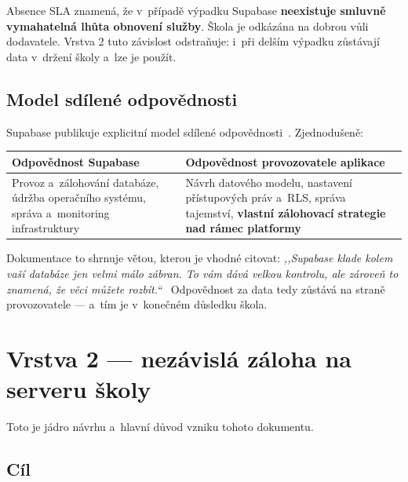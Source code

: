 \documentclass[11pt,a4paper]{article}
\begin{document}
\begin{informace}
Absence SLA znamená, že v~případě výpadku Supabase \textbf{neexistuje smluvně vymahatelná lhůta
obnovení služby}. Škola je odkázána na dobrou vůli dodavatele. Vrstva 2 tuto závislost odstraňuje:
i~při delším výpadku zůstávají data v~držení školy a~lze je použít.
\end{informace}

\subsection{Model sdílené odpovědnosti}

Supabase publikuje explicitní model sdílené odpovědnosti~\cite{sdilenaodpovednost}. Zjednodušeně:

\begin{center}
\begin{tabularx}{\textwidth}{@{}p{5.2cm}X@{}}
\toprule
\textbf{Odpovědnost Supabase} & \textbf{Odpovědnost provozovatele aplikace} \\
\midrule
Provoz a~zálohování databáze, údržba operačního systému, správa a~monitoring infrastruktury &
Návrh datového modelu, nastavení přístupových práv a~RLS, správa tajemství, \textbf{vlastní
zálohovací strategie nad rámec platformy} \\
\bottomrule
\end{tabularx}
\end{center}

Dokumentace to shrnuje větou, kterou je vhodné citovat: \emph{,,Supabase klade kolem vaší databáze
jen velmi málo zábran. To vám dává velkou kontrolu, ale zároveň to znamená, že věci můžete
rozbít.``}~\cite{sdilenaodpovednost} Odpovědnost za data tedy zůstává na straně provozovatele ---
a~tím je v~konečném důsledku škola.

\newpage

\section{Vrstva 2 --- nezávislá záloha na serveru školy}
\label{sec:vrstva2}

Toto je jádro návrhu a~hlavní důvod vzniku tohoto dokumentu.

\subsection{Cíl}
\end{document}
